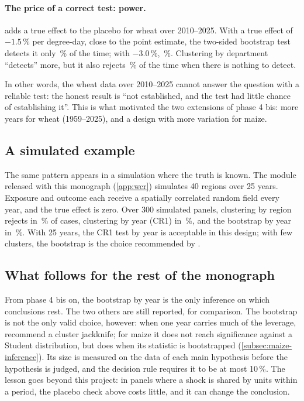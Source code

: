 \paragraph{The price of a correct test: power.}  adds a true effect to the placebo for wheat over 2010--2025. With a true effect of $-1.5$\,\% per degree-day, close to the point estimate, the two-sided bootstrap test detects it only \WheatPowerWCR\,\% of the time; with $-3.0$\,\%, \WheatPowerWCRDouble\,\%. Clustering by department ``detects'' more, but it also rejects \WheatSizeDep\,\% of the time when there is nothing to detect.

\begin{table}[H]
\centering
\small
\caption{Rejection rate (\%) for wheat 2010--2025 when a true effect is added to the placebo}
\label{tab:power}

\end{table}

In other words, the wheat data over 2010--2025 cannot answer the question with a reliable test: the honest result is ``not established, and the test had little chance of establishing it''. This is what motivated the two extensions of phase 4 bis: more years for wheat (1959--2025), and a design with more variation for maize.

\subsection{A simulated example}

The same pattern appears in a simulation where the truth is known. The module released with this monograph (\cref{app:wcr}) simulates 40 regions over 25 years. Exposure and outcome each receive a spatially correlated random field every year, and the true effect is zero. Over 300 simulated panels, clustering by region rejects in \ExRegion\,\% of cases, clustering by year (CR1) in \ExCrOne\,\%, and the bootstrap by year in \ExWcr\,\%. With 25 years, the CR1 test by year is acceptable in this design; with few clusters, the bootstrap is the choice recommended by \textcite{cameron2008}.

\subsection{What follows for the rest of the monograph}

From phase 4 bis on, the bootstrap by year is the only inference on which conclusions rest. The two others are still reported, for comparison. The bootstrap is not the only valid choice, however: when one year carries much of the leverage, \textcite{mackinnon2023} recommend a cluster jackknife; for maize it does not reach significance against a Student distribution, but does when its statistic is bootstrapped (\cref{subsec:maize-inference}). Its size is measured on the data of each main hypothesis before the hypothesis is judged, and the decision rule requires it to be at most 10\,\%. The lesson goes beyond this project: in panels where a shock is shared by units within a period, the placebo check above costs little, and it can change the conclusion.
